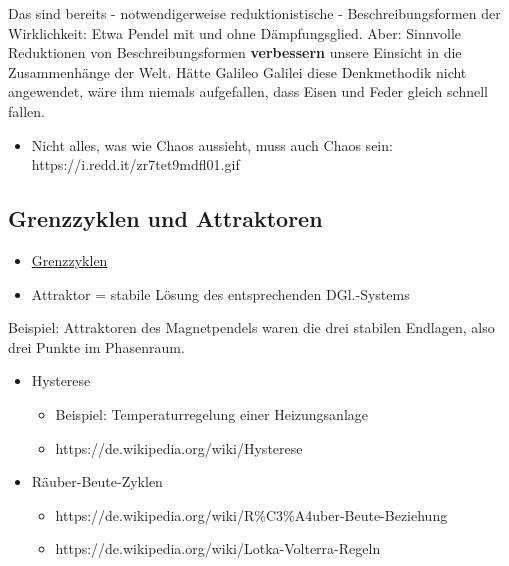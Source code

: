 \documentclass[11pt,a4paper]{article}
\begin{document}
Das sind bereits - notwendigerweise reduktionistische -
Beschreibungsformen der Wirklichkeit: Etwa Pendel mit und ohne
Dämpfungsglied. Aber: Sinnvolle Reduktionen von Beschreibungsformen
\textbf{verbessern} unsere Einsicht in die Zusammenhänge der Welt. Hätte
Galileo Galilei diese Denkmethodik nicht angewendet, wäre ihm niemals
aufgefallen, dass Eisen und Feder gleich schnell fallen.

\begin{itemize}
[noitemsep]
\item
  Nicht alles, was wie Chaos aussieht, muss auch Chaos sein:
  https://i.redd.it/zr7tet9mdfl01.gif
\end{itemize}

\hypertarget{grenzzyklen-und-attraktoren}{%
\subsection{Grenzzyklen und
Attraktoren}\label{grenzzyklen-und-attraktoren}}

\begin{itemize}
[noitemsep]
\item
  \href{https://de.wikipedia.org/wiki/Grenzzyklus}{Grenzzyklen}
\item
  Attraktor = stabile Lösung des entsprechenden DGl.-Systems
\end{itemize}

Beispiel: Attraktoren des Magnetpendels waren die drei stabilen
Endlagen, also drei Punkte im Phasenraum.

\begin{itemize}
[noitemsep]
\item
  Hysterese

  \begin{itemize}
  [noitemsep]
  \item
    Beispiel: Temperaturregelung einer Heizungsanlage
  \item
    https://de.wikipedia.org/wiki/Hysterese
  \end{itemize}
\item
  Räuber-Beute-Zyklen

  \begin{itemize}
  [noitemsep]
  \item
    https://de.wikipedia.org/wiki/R\%C3\%A4uber-Beute-Beziehung
  \item
    https://de.wikipedia.org/wiki/Lotka-Volterra-Regeln
  \end{itemize}
\end{itemize}
\end{document}
